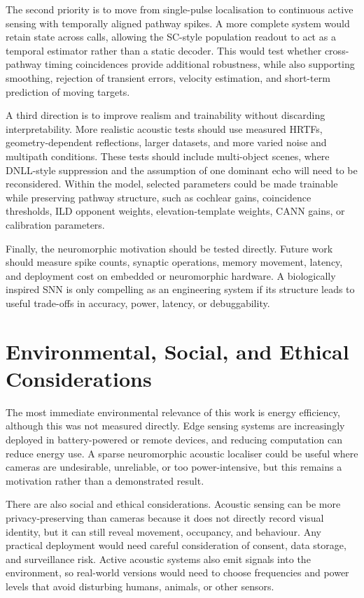 The second priority is to move from single-pulse localisation to continuous active sensing with temporally aligned pathway spikes. A more complete system would retain state across calls, allowing the SC-style population readout to act as a temporal estimator rather than a static decoder. This would test whether cross-pathway timing coincidences provide additional robustness, while also supporting smoothing, rejection of transient errors, velocity estimation, and short-term prediction of moving targets.

A third direction is to improve realism and trainability without discarding interpretability. More realistic acoustic tests should use measured HRTFs, geometry-dependent reflections, larger datasets, and more varied noise and multipath conditions. These tests should include multi-object scenes, where DNLL-style suppression and the assumption of one dominant echo will need to be reconsidered. Within the model, selected parameters could be made trainable while preserving pathway structure, such as cochlear gains, coincidence thresholds, ILD opponent weights, elevation-template weights, CANN gains, or calibration parameters.

Finally, the neuromorphic motivation should be tested directly. Future work should measure spike counts, synaptic operations, memory movement, latency, and deployment cost on embedded or neuromorphic hardware. A biologically inspired SNN is only compelling as an engineering system if its structure leads to useful trade-offs in accuracy, power, latency, or debuggability.

\section{Environmental, Social, and Ethical Considerations}

The most immediate environmental relevance of this work is energy efficiency, although this was not measured directly. Edge sensing systems are increasingly deployed in battery-powered or remote devices, and reducing computation can reduce energy use. A sparse neuromorphic acoustic localiser could be useful where cameras are undesirable, unreliable, or too power-intensive, but this remains a motivation rather than a demonstrated result.

There are also social and ethical considerations. Acoustic sensing can be more privacy-preserving than cameras because it does not directly record visual identity, but it can still reveal movement, occupancy, and behaviour. Any practical deployment would need careful consideration of consent, data storage, and surveillance risk. Active acoustic systems also emit signals into the environment, so real-world versions would need to choose frequencies and power levels that avoid disturbing humans, animals, or other sensors.

